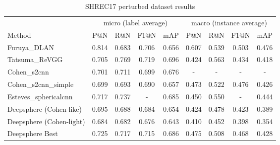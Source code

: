 \documentclass[11pt]{report}
\begin{document}
\begin{table}[ht]
    \centering
    \begin{tabular}{l|c c c c|c c c c}
         & \multicolumn{4}{c|}{micro (label average)} & \multicolumn{4}{c}{macro (instance average)} \\
        Method & P@N & R@N & F1@N & mAP & P@N & R@N & F1@N & mAP \\ \hline
        Furuya\_DLAN & 0.814 & 0.683 & 0.706 & 0.656 & 0.607 & 0.539 & 0.503 & 0.476 \\
        Tatsuma\_ReVGG & 0.705 & 0.769 & 0.719 & 0.696 & 0.424 & 0.563 & 0.434 & 0.418\\ \hline
        Cohen\_s2cnn & 0.701 & 0.711 & 0.699 & 0.676 & - & - & - & - \\
        Cohen\_s2cnn\_simple & 0.699 & 0.693 & 0.690 & 0.657 & 0.473 & 0.522 & 0.476 & 0.426\\
        Esteves\_sphericalcnn & 0.717 & 0.737 & - & 0.685 & 0.450 & 0.550 & - & 0.444\\ \hline
        Deepsphere (Cohen-like) & 0.695 & 0.688 & 0.684 & 0.654 & 0.424 & 0.478 & 0.423 & 0.389\\
        Deepsphere (Cohen-light) & 0.684 & 0.682 & 0.676 & 0.643 & 0.410 & 0.452 & 0.398 & 0.354 \\
        Deepsphere Best & 0.725 & 0.717 & 0.715 & 0.686 & 0.475 & 0.508 & 0.468 & 0.428
    \end{tabular}
    \caption{SHREC17 perturbed dataset results}
    \label{tab:SHREC17_retriev}
\end{table}

\end{document}
